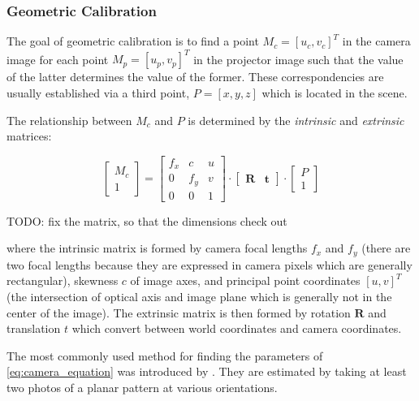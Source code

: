 \subsubsection{Geometric Calibration}
\label{section:background-projection_mapping-procams-geometric_calibration}

The goal of geometric calibration is to find a point \(M_c = [u_c, v_c]^T\) in the camera image for each point \(M_p = [u_p, v_p]^T\) in the projector image such that the value of the latter determines the value of the former. These correspondencies are usually established via a third point, \(P = [x, y, z]\) which is located in the scene.

The relationship between \(M_c\) and \(P\) is determined by the \textit{intrinsic} and \textit{extrinsic} matrices:

\begin{equation}
    \label{eq:camera_equation}
    \begin{bmatrix}
        M_c \\
        1
    \end{bmatrix} =
    \begin{bmatrix}
        f_x & c & u \\
        0 & f_y & v \\
        0 & 0 & 1 
    \end{bmatrix} \cdot
    \begin{bmatrix}
        \mathbf{R} & \mathbf{t}
    \end{bmatrix} \cdot
    \begin{bmatrix}
        P \\
        1
    \end{bmatrix}
\end{equation}

{\color{red} TODO: fix the matrix, so that the dimensions check out}

where the intrinsic matrix is formed by camera focal lengths \(f_x\) and \(f_y\) (there are two focal lengths because they are expressed in camera pixels which are generally rectangular), skewness \(c\) of image axes, and principal point coordinates \([u, v]^T\) (the intersection of optical axis and image plane which is generally not in the center of the image). The extrinsic matrix is then formed by rotation \(\mathbf{R}\) and translation \(t\) which convert between world coordinates and camera coordinates.

The most commonly used method for finding the parameters of \ref{eq:camera_equation} was introduced by \citet{Zhang1999}. They are estimated by taking at least two photos of a planar pattern at various orientations.

